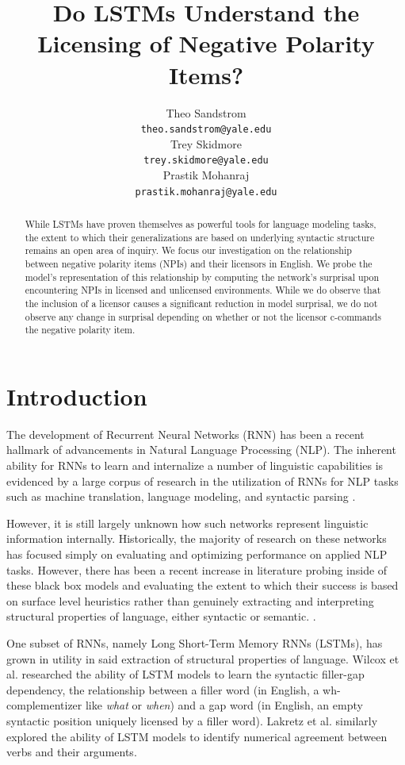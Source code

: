 \documentclass[11pt, round]{article}
\title{Do LSTMs Understand the Licensing of Negative Polarity Items?}
\author{Theo Sandstrom \\
  \texttt{theo.sandstrom@yale.edu} \\
  Trey Skidmore \\
  \texttt{trey.skidmore@yale.edu} \\
  Prastik Mohanraj \\
  \texttt{prastik.mohanraj@yale.edu}}
\begin{document}
\maketitle

\begin{abstract}
While LSTMs have proven themselves as powerful tools for language modeling tasks, the extent to which their generalizations are based on underlying syntactic structure remains an open area of inquiry. We focus our investigation on the relationship between negative polarity items (NPIs) and their licensors in English. We probe the model's representation of this relationship by computing the network's surprisal upon encountering NPIs in licensed and unlicensed environments. While we do observe that the inclusion of a licensor causes a significant reduction in model surprisal, we do not observe any change in surprisal depending on whether or not the licensor c-commands the negative polarity item. 
\end{abstract}

\section{Introduction}

The development of Recurrent Neural Networks (RNN) has been a recent hallmark of advancements in Natural Language Processing (NLP). The inherent ability for RNNs to learn and internalize a number of linguistic capabilities is evidenced by a large corpus of research in the utilization of RNNs for NLP tasks such as machine translation, language modeling, and syntactic parsing \cite{wilcox-etal-2018-rnn,gulordava2018colorless,jozefowicz2016exploring}. 

However, it is still largely unknown how such networks represent linguistic information internally. Historically, the majority of research on these networks has focused simply on evaluating and optimizing performance on applied NLP tasks. However, there has been a recent increase in literature probing inside of these black box models and evaluating the extent to which their success is based on surface level heuristics rather than genuinely extracting and interpreting structural properties of language, either syntactic or semantic. \cite{lakretz2019emergence}.

One subset of RNNs, namely Long Short-Term Memory RNNs (LSTMs), has grown in utility in said extraction of structural properties of language. Wilcox et al.  researched the ability of LSTM models to learn the syntactic filler-gap dependency, the relationship between a filler word (in English, a wh- complementizer like \textit{what} or \textit{when}) and a gap word (in English, an empty syntactic position uniquely licensed by a filler word). Lakretz et al.  similarly explored the ability of LSTM models to identify numerical agreement between verbs and their arguments. 
\end{document}
